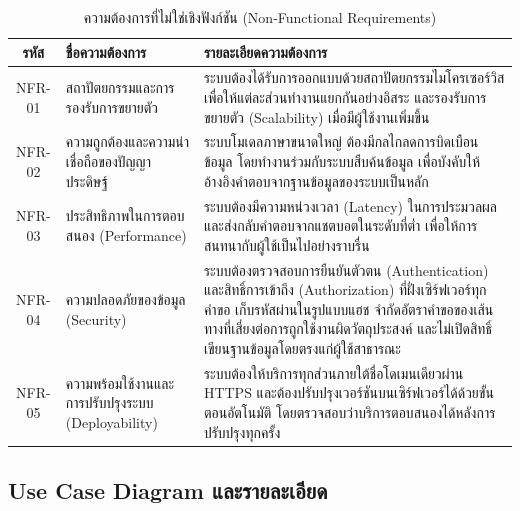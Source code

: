 \nopagebreak
\begin{table}[H]
\centering
\caption{ความต้องการที่ไม่ใช่เชิงฟังก์ชัน (Non-Functional Requirements)}
\label{tab:nonfunc_req}
\begin{tabular}{|c|p{4cm}|p{7cm}|}
\hline
\textbf{รหัส} & \textbf{ชื่อความต้องการ} & \textbf{รายละเอียดความต้องการ} \\
\hline
NFR-01 & สถาปัตยกรรมและการรองรับการขยายตัว & ระบบต้องได้รับการออกแบบด้วยสถาปัตยกรรมไมโครเซอร์วิส เพื่อให้แต่ละส่วนทำงานแยกกันอย่างอิสระ และรองรับการขยายตัว (Scalability) เมื่อมีผู้ใช้งานเพิ่มขึ้น \\ \hline
NFR-02 & ความถูกต้องและความน่าเชื่อถือของปัญญาประดิษฐ์ & ระบบโมเดลภาษาขนาดใหญ่ ต้องมีกลไกลดการบิดเบือนข้อมูล โดยทำงานร่วมกับระบบสืบค้นข้อมูล เพื่อบังคับให้อ้างอิงคำตอบจากฐานข้อมูลของระบบเป็นหลัก \\ \hline
NFR-03 & ประสิทธิภาพในการตอบสนอง (Performance) & ระบบต้องมีความหน่วงเวลา (Latency) ในการประมวลผลและส่งกลับคำตอบจากแชตบอตในระดับที่ต่ำ เพื่อให้การสนทนากับผู้ใช้เป็นไปอย่างราบรื่น \\ \hline
NFR-04 & ความปลอดภัยของข้อมูล (Security) & ระบบต้องตรวจสอบการยืนยันตัวตน (Authentication) และสิทธิ์การเข้าถึง (Authorization) ที่ฝั่งเซิร์ฟเวอร์ทุกคำขอ เก็บรหัสผ่านในรูปแบบแฮช จำกัดอัตราคำขอของเส้นทางที่เสี่ยงต่อการถูกใช้งานผิดวัตถุประสงค์ และไม่เปิดสิทธิ์เขียนฐานข้อมูลโดยตรงแก่ผู้ใช้สาธารณะ \\ \hline
NFR-05 & ความพร้อมใช้งานและการปรับปรุงระบบ (Deployability) & ระบบต้องให้บริการทุกส่วนภายใต้ชื่อโดเมนเดียวผ่าน HTTPS และต้องปรับปรุงเวอร์ชันบนเซิร์ฟเวอร์ได้ด้วยขั้นตอนอัตโนมัติ โดยตรวจสอบว่าบริการตอบสนองได้หลังการปรับปรุงทุกครั้ง \\
\hline
\end{tabular}
\end{table}

\subsection{Use Case Diagram และรายละเอียด}

\newcommand{\umlactor}[2]{%
  \begin{scope}[shift={(#1)}]
    \draw[thick] (0,1.05) circle (0.22);
    \draw[thick] (0,0.83) -- (0,0.25);
    \draw[thick] (-0.28,0.65) -- (0.28,0.65);
    \draw[thick] (0,0.25) -- (-0.28,-0.25);
    \draw[thick] (0,0.25) -- (0.28,-0.25);
    \node[font=\small, align=center, below=2pt] at (0,-0.25) {#2};
  \end{scope}
}

